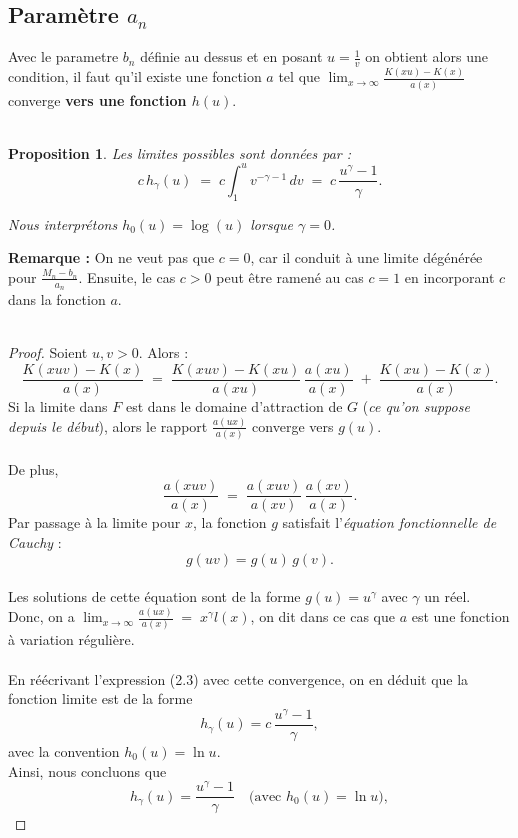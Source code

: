 \documentclass{article}
\theoremstyle{plain}
\theoremstyle{definition}
\theoremstyle{plain}
\newtheorem{proposition}[definition]{Proposition}
\begin{document}
\subsection{Paramètre $a_n$}
Avec le parametre $b_n$ définie au dessus et en posant $u=\frac{1}{v}$ on obtient alors une condition, il faut qu'il existe une fonction $a$ tel que $\lim_{x \to \infty} \frac{K(xu) - K(x)}{a(x)}$ converge \textbf{vers une fonction $h(u)$}.
\\
\\
\begin{proposition}

Les limites possibles sont données par :
\begin{equation}\label{eq:1.2}
    c\,h_{\gamma}(u) 
    \;=\; 
    c \int_{1}^{u} v^{-\gamma - 1}\,dv 
    \;=\; 
    c\,\frac{u^{\gamma} - 1}{\gamma}.
\end{equation}

Nous interprétons $h_{0}(u) = \log(u)$ lorsque $\gamma = 0$.
\end{proposition}


\noindent \textbf{Remarque :} On ne veut pas que $c=0$, car il conduit à une limite dégénérée pour $\frac{M_{n} - b_n}{a_n}$. 
Ensuite, le cas $c>0$ peut être ramené au cas $c=1$ en incorporant $c$ dans la fonction $a$.   
\\
\\
\begin{proof} 
Soient $u,v >0$. Alors :
\[
\frac{K(xuv) - K(x)}{a(x)} 
\;=\; 
\frac{K(xuv) - K(xu)}{a(xu)} \,\frac{a(xu)}{a(x)}
\;+\;
\frac{K(xu) - K(x)}{a(x)}.
\tag{3}
\]
Si la limite dans $F$ est dans le domaine d'attraction de $G$ (\textit{ce qu'on suppose depuis le début}), alors le rapport $\frac{a(ux)}{a(x)}$ converge vers $g(u)$.
\\
\\
De plus,
\[
\frac{a(xuv)}{a(x)} 
\;=\;
\frac{a(xuv)}{a(xv)} \,\frac{a(xv)}{a(x)}.
\]
Par passage à la limite pour $x$, la fonction $g$ satisfait l'\textit{équation fonctionnelle de Cauchy} :
\[
g(uv) = g(u)\,g(v).
\]
\\
Les solutions de cette équation sont de la forme $g(u)= u^{\gamma}$ avec $\gamma$ un réel.
\\
Donc, on a $\lim_{x\to \infty} \frac{a(ux)}{a(x)} \;=\; x^{\gamma} l(x)$, on dit dans ce cas que $a$ est une fonction à variation régulière.
\\
\\
En réécrivant l'expression (2.3) avec cette convergence, on en déduit que la fonction limite est de la forme
\[
h_\gamma(u)= c\,\frac{u^\gamma-1}{\gamma},
\]
avec la convention \(h_0(u)=\ln u\).
\\
Ainsi, nous concluons que
\[
h_\gamma(u)=\frac{u^\gamma-1}{\gamma} \quad \text{(avec \(h_0(u)=\ln u\))},
\]
\end{proof}
\end{document}

